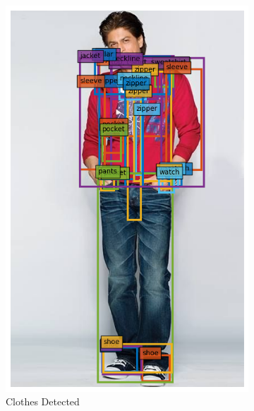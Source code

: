 \begin{figure}[H]
\begin{subfigure}[b]{0.3\textwidth}
      \includegraphics[width=\textwidth]{images/detected_imgae.png}
      \caption{Clothes Detected}
  \end{subfigure}
  \begin{subfigure}[b]{0.2\textwidth}

\end{subfigure}
\end{figure}
